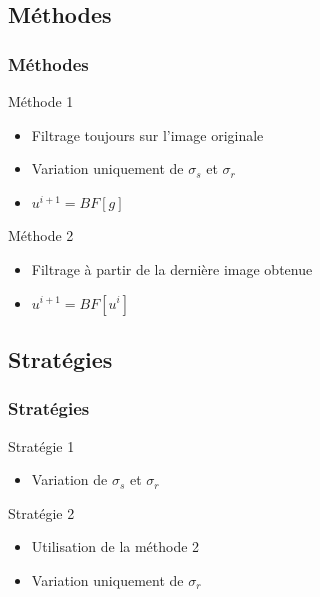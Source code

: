 \documentclass[compress]{beamer}
\begin{document}
\subsection{Méthodes}
\begin{frame}\frametitle{Méthodes}
	\begin{block}{Méthode 1}
		\begin{itemize}
			\item Filtrage toujours sur l'image originale
			\item Variation uniquement de $\sigma_s$ et $\sigma_r$
			\item $u^{i+1} = BF[g]$
		\end{itemize}
	\end{block}
\pause	
	\begin{block}{Méthode 2}
		\begin{itemize}
			\item Filtrage à partir de la dernière image obtenue
			\item $u^{i+1} = BF[u^i]$
		\end{itemize}
	\end{block}

\end{frame}

\subsection{Stratégies}
\begin{frame}\frametitle{Stratégies}
	\begin{block}{Stratégie 1}
		\begin{itemize}
			\item Variation de $\sigma_s$ et $\sigma_r$
		\end{itemize}
	\end{block}
\pause
	\begin{block}{Stratégie 2}
		\begin{itemize}
			\item Utilisation de la méthode 2
			\item Variation uniquement de $\sigma_r$
		\end{itemize}
	\end{block}
\end{frame}
\end{document}

